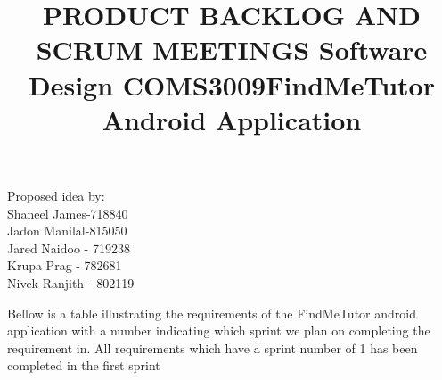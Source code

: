 \documentclass[12pt]{article}
\begin{document}
\title{\textbf{PRODUCT BACKLOG AND SCRUM MEETINGS }}
\maketitle
\begin{center}
\title{\textbf{Software Design COMS3009}}
\maketitle 

\title{\textbf{FindMeTutor Android Application}}
\maketitle 
\end{center}


\begin{center}
Proposed idea by:\\
Shaneel James-718840
\\Jadon Manilal-815050
\\Jared Naidoo - 719238
\\Krupa Prag - 782681
\\Nivek Ranjith - 802119
\end{center}

\newpage






\tableofcontents
\newpage
\begin{flushleft}

Bellow is a table illustrating the requirements of the FindMeTutor android application with a number indicating which sprint we plan on completing the requirement in. All requirements which have a sprint number of 1 has been completed in the first sprint\\
\end{flushleft}
\end{document}
